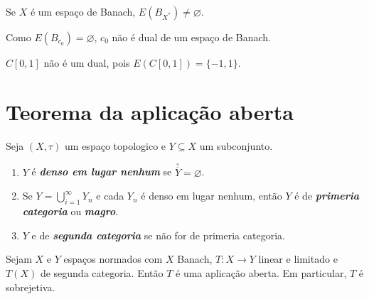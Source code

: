 \documentclass[portuguese]{article}
\theoremstyle{definition}
\begin{document}
	\begin{coro}
		Se $X$ é um espaço de Banach, $E(B_{X^*})\neq\varnothing$.
	\end{coro}
	\begin{coro}
		Como $E(B_{c_0})=\varnothing$, $c_0$ não é dual de um espaço de Banach.
	\end{coro}
	\begin{coro}
		$C[0,1]$ não é um dual, pois $E(C[0,1])=\{-1,1\}$.
	\end{coro}
	
	\section{Teorema da aplicação aberta}
	\begin{defn}
		Seja $(X,\tau)$ um espaço topologico e $Y\subseteq X$ um subconjunto.
		\begin{enumerate}
			\item $Y$ é \textbf{\textit{denso em lugar nenhum}} se $\overset{\circ}{\overline{Y}}=\varnothing$.
			\item Se $Y=\bigcup_{i=1}^\infty Y_n$ e cada $Y_n$ é denso em lugar nenhum, então $Y$ é de \textbf{\textit{primeria categoria}} ou \textbf{\textit{magro}}.
			\item $Y$ e de \textbf{\textit{segunda categoria}} se não for de primeria categoria.
		\end{enumerate}
	\end{defn}
	\begin{teo}
		Sejam $X$ e $Y$ espaços normados com $X$ Banach, $T:X\to Y$ linear e limitado e $T(X)$ de segunda categoria. Então $T$ é uma aplicação aberta. Em particular, $T$ é sobrejetiva.
	\end{teo}
\end{document}
